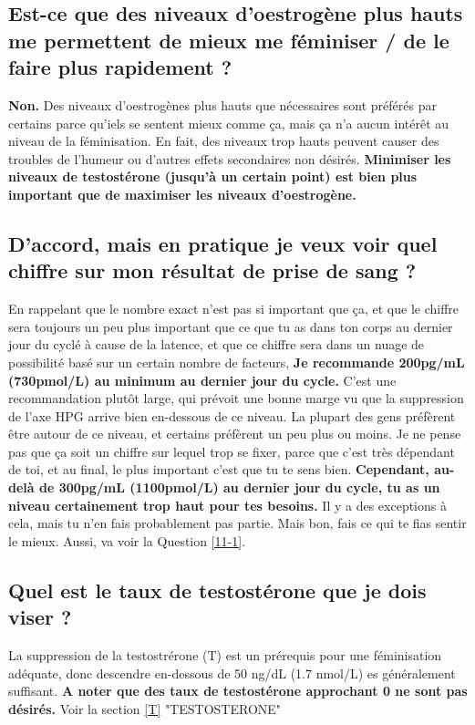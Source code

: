 \documentclass{article}
\begin{document}
\subsection{Est-ce que des niveaux d'oestrogène plus hauts me permettent de mieux me féminiser / de le faire plus rapidement ?}

\textbf{Non.} Des niveaux d'oestrogènes plus hauts que nécessaires sont préférés par certains parce qu'iels se sentent mieux comme ça, mais ça n'a aucun intérêt au niveau de la féminisation. En fait, des niveaux trop hauts peuvent causer des troubles de l'humeur ou d'autres effets secondaires non désirés. \textbf{Minimiser les niveaux de testostérone (jusqu'à un certain point) est bien plus important que de maximiser les niveaux d'oestrogène.}

\subsection{D'accord, mais en pratique je veux voir quel chiffre sur mon résultat de prise de sang ?}

En rappelant que le nombre exact n'est pas si important que ça, et que le chiffre sera toujours un peu plus important que ce que tu as dans ton corps au dernier jour du cyclé à cause de la latence, et que ce chiffre sera dans un nuage de possibilité basé sur un certain nombre de facteurs, \textbf{Je recommande 200pg/mL (730pmol/L) au minimum au dernier jour du cycle.} C'est une recommandation plutôt large, qui prévoit une bonne marge vu que la suppression de l'axe HPG arrive bien en-dessous de ce niveau. La plupart des gens préfèrent être autour de ce niveau, et certains préfèrent un peu plus ou moins. Je ne pense pas que ça soit un chiffre sur lequel trop se fixer, parce que c'est très dépendant de toi, et au final, le plus important c'est que tu te sens bien. \textbf{Cependant, au-delà de 300pg/mL (1100pmol/L) au dernier jour du cycle, tu as un niveau certainement trop haut pour tes besoins.} Il y a des exceptions à cela, mais tu n'en fais probablement pas partie. Mais bon, fais ce qui te fias sentir le mieux. Aussi, va voir la Question \ref{11-1}.

\subsection{Quel est le taux de testostérone que je dois viser ?}

La suppression de la testostrérone (T) est un prérequis pour une féminisation adéquate, donc descendre en-dessous de 50 ng/dL (1.7 nmol/L) es généralement suffisant. \textbf{A noter que des taux de testostérone approchant 0 ne sont pas désirés.} Voir la section \ref{T} "TESTOSTERONE" 
\end{document}
